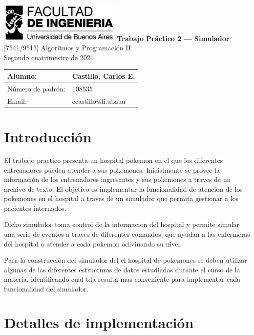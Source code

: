 \documentclass[titlepage,a4paper]{article}
\makeatletter
\newcommand{\FirstName}{Carlos E.}
\newcommand{\LastName}{Castillo}
\newcommand{\StudentID}{108535}
\newcommand{\StudentEmail}{ccastillo@fi.uba.ar}
\newcommand{\ProjectName}{Trabajo Práctico 2 — Simulador}
\makeatother
\begin{document}
\begin{titlepage}
	\hfill\includegraphics[width=6cm]{logofiuba.jpg}
    \centering
    \vfill
    \Huge \textbf{\ProjectName}
    \vskip2cm
    \Large [7541/9515] Algoritmos y Programación II\\
    Segundo cuatrimestre de 2021 
    \vfill
    \begin{tabular}{ | l | l | }
      \hline
      Alumno: & \LastName, \FirstName \\ \hline
      Número de padrón: & \StudentID \\ \hline
      Email: & \StudentEmail \\ \hline
  	\end{tabular}
    \vfill
    \vfill
\end{titlepage}

\tableofcontents
\newpage


\section{Introducción}\label{sec:intro}

El trabajo practico presenta un hospital pokemon en el que los diferentes
entrenadores pueden atender a sus pokemones. Inicialmente se provee la
información de los entrenadores ingresantes y sus pokemones a traves de un
archivo de texto. El objetivo es implementar la funcionalidad de atencion de
los pokemones en el hospital a traves de un simulador que permita gestionar
a los pacientes internados.

Dicho simulador toma control de la informacion del hospital y permite simular
una serie de eventos a traves de diferentes comandos, que ayudan a las
enfermeras del hospital a atender a cada pokemon adivinando su nivel.

Para la construcción del simulador del el hospital de pokemones se deben
utilizar algunas de las diferentes estructuras de datos estudiadas durante
el curso de la materia, identificando cual tda resulta mas conveniente para
implementar cada funcionalidad del simulador.


\section{Detalles de implementación}\label{sec:implementacion}
\end{document}
